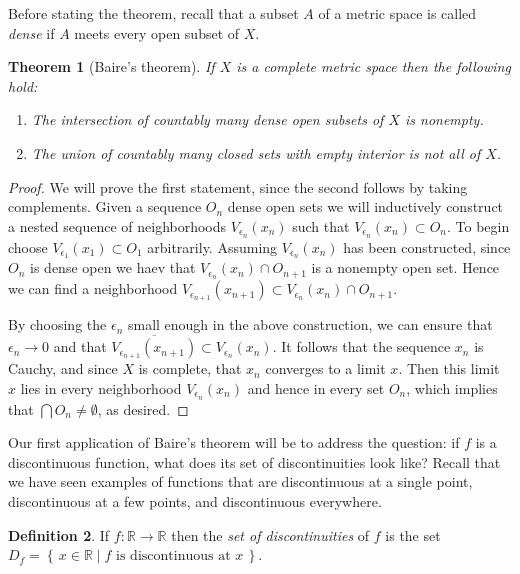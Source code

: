 \documentclass[11pt,oneside]{amsbook}
\newcommand{\set}[1]{\left\{\,#1\,\right\}}
\newcommand{\RR}{\mathbb R}
\theoremstyle{definition}
\theoremstyle{plain}
\newtheorem{thm}{Theorem}[section]
\theoremstyle{definition}
\newtheorem{defn}[thm]{Definition}
\theoremstyle{remark}
\numberwithin{equation}{section}
\numberwithin{figure}{section}
\begin{document}
Before stating the theorem, recall that a subset $A$ of a metric space is called \emph{dense} if $A$ meets every open subset of $X$.

\begin{thm}[Baire's theorem]
  If $X$ is a complete metric space then the following hold:
  \begin{enumerate}
  \item The intersection of countably many dense open subsets of $X$ is nonempty.
  \item The union of countably many closed sets with empty interior is not all of $X$.
  \end{enumerate}
\end{thm}

\begin{proof}
  We will prove the first statement, since the second follows by taking complements. Given a sequence $O_n$ dense open sets we will inductively construct a nested sequence of neighborhoods $V_{\epsilon_n}(x_n)$ such that $V_{\epsilon_n}(x_n)\subset O_n$. To begin choose $V_{\epsilon_1}(x_1)\subset O_1$ arbitrarily. Assuming $V_{\epsilon_n}(x_n)$ has been constructed, since $O_n$ is dense open we haev that $V_{\epsilon_n}(x_n)\cap O_{n+1}$ is a nonempty open set. Hence we can find a neighborhood $V_{\epsilon_{n+1}}(x_{n+1})\subset V_{\epsilon_n}(x_n)\cap O_{n+1}$.

  By choosing the $\epsilon_n$ small enough in the above construction, we can ensure that $\epsilon_n\to0$ and that $\overline{V_{\epsilon_{n+1}}(x_{n+1})}\subset V_{\epsilon_n}(x_n)$. It follows that the sequence $x_n$ is Cauchy, and since $X$ is complete, that $x_n$ converges to a limit $x$. Then this limit $x$ lies in every neighborhood $V_{\epsilon_n}(x_n)$ and hence in every set $O_n$, which implies that $\bigcap O_n\neq\emptyset$, as desired.
\end{proof}

Our first application of Baire's theorem will be to address the question: if $f$ is a discontinuous function, what does its set of discontinuities look like? Recall that we have seen examples of functions that are discontinuous at a single point, discontinuous at a few points, and discontinuous everywhere.

\begin{defn}
  If $f\colon\RR\to\RR$ then the \emph{set of discontinuities} of $f$ is the set $D_f=\set{x\in\RR\mid\text{$f$ is discontinuous at $x$}}$.
\end{defn}
\end{document}
